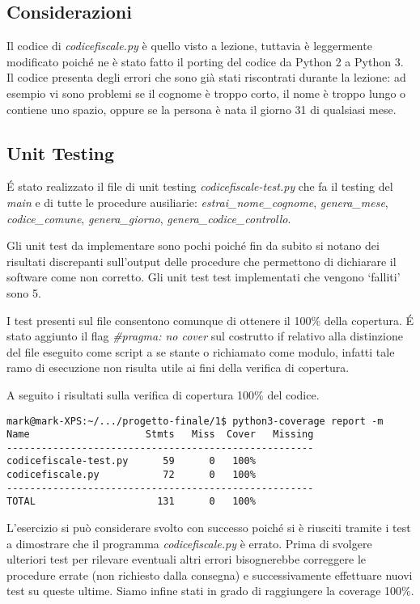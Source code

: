 \documentclass{article}
\newcommand{\py}{Python }
\newcommand{\pycode}[1]{\textit{#1}}
\newcommand{\filename}[1]{\textit{#1}}
\newcommand{\function}[1]{\textit{#1}}
\begin{document}
\subsection{Considerazioni}
Il codice di \filename{codicefiscale.py} è quello visto a lezione, tuttavia è leggermente modificato poiché ne è stato fatto il porting del codice da \py 2 a \py 3. Il codice presenta degli errori che sono già stati riscontrati durante la lezione: ad esempio vi sono problemi se il cognome è troppo corto, il nome è troppo lungo o contiene uno spazio, oppure se la persona è nata il giorno 31 di qualsiasi mese.

\subsection{Unit Testing}
\'E stato realizzato il file di unit testing \filename{codicefiscale-test.py} che fa il testing del \function{main} e di tutte le procedure ausiliarie: \function{estrai\_nome\_cognome}, \function{genera\_mese}, \function{codice\_comune}, \function{genera\_giorno}, \function{genera\_codice\_controllo}.

Gli unit test da implementare sono pochi poiché fin da subito si notano dei risultati discrepanti sull'output delle procedure che permettono di dichiarare il software come non corretto.
Gli unit test test implementati che vengono `falliti' sono 5.

I test presenti sul file consentono comunque di ottenere il 100\% della copertura. \'E stato aggiunto il flag \pycode{\#pragma: no cover} sul costrutto if relativo alla distinzione del file eseguito come script a se stante o richiamato come modulo, infatti tale ramo di esecuzione non risulta utile ai fini della verifica di copertura.

A seguito i risultati sulla verifica di copertura 100\% del codice.
\begin{verbatim}
mark@mark-XPS:~/.../progetto-finale/1$ python3-coverage report -m
Name                    Stmts   Miss  Cover   Missing
-----------------------------------------------------
codicefiscale-test.py      59      0   100%
codicefiscale.py           72      0   100%
-----------------------------------------------------
TOTAL                     131      0   100%
\end{verbatim}

L'esercizio si può considerare svolto con successo poiché si è riusciti tramite i test a dimostrare che il programma \filename{codicefiscale.py} è errato. Prima di svolgere ulteriori test per rilevare eventuali altri errori bisognerebbe correggere le procedure errate (non richiesto dalla consegna) e successivamente effettuare nuovi test su queste ultime. Siamo infine stati in grado di raggiungere la coverage 100\%.
\end{document}
